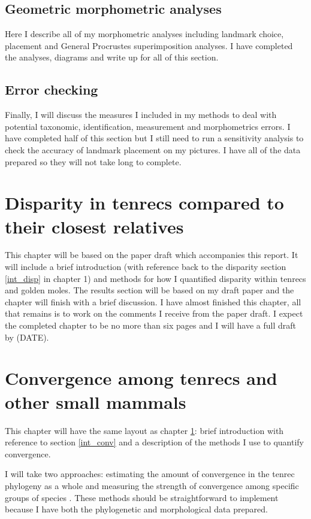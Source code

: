 \documentclass[12pt,a4paper]{article}
\begin{document}
	\subsection{Geometric morphometric analyses}
		Here I describe all of my morphometric analyses including landmark choice, placement and General Procrustes superimposition analyses. I have completed the analyses, diagrams and write up for all of this section.
		
	\subsection{Error checking}
		Finally, I will discuss the measures I included in my methods to deal with potential taxonomic, identification, measurement and morphometrics errors. I have completed half of this section but I still need to run a sensitivity analysis to check the accuracy of landmark placement on my pictures. I have all of the data prepared so they will not take long to complete.

\section{Disparity in tenrecs compared to their closest relatives}
	\label{sect_disp}
	This chapter will be based on the paper draft which accompanies this report. It will include a brief introduction (with reference back to the disparity section \ref*{int_disp} in chapter 1) and methods for how I quantified disparity within tenrecs and golden moles. The results section will be based on my draft paper and the chapter will finish with a brief discussion.
	I have almost finished this chapter, all that remains is to work on the comments I receive from the paper draft. I expect the completed chapter to be no more than six pages and I will have a full draft by (DATE).
	

\section{Convergence among tenrecs and other small mammals}
	\label{sect_conv}
	This chapter will have the same layout as chapter \ref{sect_disp}: brief introduction with reference to section \ref{int_conv} and a description of the methods I use to quantify convergence. 
	
	I will take two approaches: estimating the amount of convergence in the tenrec phylogeny as a whole \citep{Stayton2008} and measuring the strength of convergence among specific groups of species \citep{Arbuckle2014}. These methods should be straightforward to implement because I have both the phylogenetic and morphological data prepared. 
		
\end{document}

